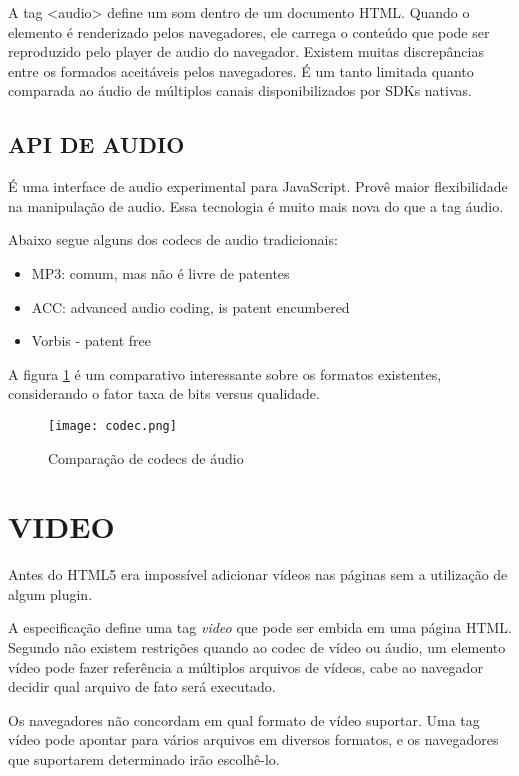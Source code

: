 A tag <audio> define um som dentro de um documento HTML. Quando o
elemento é renderizado pelos navegadores, ele carrega o conteúdo
que pode ser reproduzido pelo player de audio do navegador. Existem
muitas discrepâncias entre os formados aceitáveis pelos navegadores.
É um tanto limitada quanto comparada ao áudio de múltiplos canais
disponibilizados por SDKs nativas.

\subsection{API DE AUDIO}

É uma interface de audio experimental para JavaScript. Provê maior
flexibilidade na manipulação de audio. Essa tecnologia é muito mais
nova do que a tag áudio.


Abaixo segue alguns dos codecs de audio tradicionais:
\begin{itemize}
    \item{MP3: comum, mas não é livre de patentes}
    \item{ACC: advanced audio coding, is patent encumbered} \item{Vorbis - patent free}
\end{itemize}

A figura \ref{fig:audioCodecs} é um comparativo interessante sobre os formatos existentes, considerando o fator taxa de bits versus qualidade.

\begin{figure}
    \centering
    \texttt{[image: codec.png]}
	\caption{Comparação de codecs de áudio}
    \label{fig:audioCodecs}
\end{figure}



\section{VIDEO}
Antes do HTML5 era impossível adicionar vídeos nas páginas sem a utilização de algum plugin.

A especificação define uma tag \textit{video} que pode ser embida em uma página HTML. Segundo \cite{diveIntohtml} não existem restrições quando ao codec de vídeo ou áudio, um elemento vídeo pode fazer referência a múltiplos arquivos de vídeos, cabe ao navegador decidir qual arquivo de fato será executado.

Os navegadores não concordam em qual formato de vídeo suportar.
Uma tag vídeo pode apontar para vários arquivos em diversos formatos, e os navegadores que suportarem determinado irão escolhê-lo.

